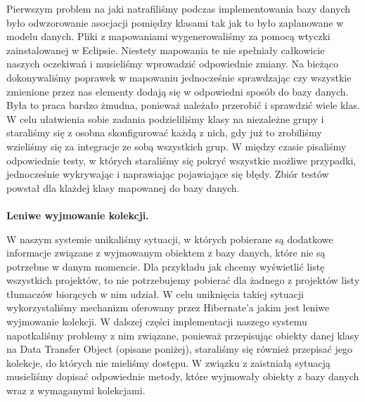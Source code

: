 \documentclass[licencjacka]{pracamgr}
\begin{document}
Pierwszym problem na jaki natrafiliśmy podczas implementowania bazy danych było odwzorowanie asocjacji pomiędzy klasami tak jak to było zaplanowane 
w modelu danych. Pliki z mapowaniami wygenerowaliśmy za pomocą wtyczki zainstalowanej w Eclipsie. Niestety mapowania te nie spełniały całkowicie 
naszych oczekiwań i musieliśmy wprowadzić odpowiednie zmiany. Na bieżąco dokonywaliśmy poprawek w mapowaniu jednocześnie sprawdzając czy wszystkie 
zmienione przez nas elementy dodają się w odpowiedni sposób do bazy danych. Była to praca bardzo żmudna, ponieważ należało przerobić i sprawdzić wiele 
klas. W celu ułatwienia sobie zadania podzieliliśmy klasy na niezależne grupy i staraliśmy się z osobna skonfigurować każdą z nich, gdy już to zrobiliśmy 
wzieliśmy się za integracje ze sobą wszystkich grup. W między czasie pisaliśmy odpowiednie testy, w których staraliśmy się pokryć wszystkie możliwe 
przypadki, jednocześnie wykrywając i naprawiając pojawiające się błędy. Zbiór testów powstał dla klażdej klasy mapowanej do bazy danych.\\\\
\textbf{Leniwe wyjmowanie kolekcji.}

W naszym systemie unikaliśmy sytuacji, w których pobierane są dodatkowe informacje związane z wyjmowanym obiektem z bazy danych, które nie są potrzebne 
w danym momencie. Dla przykładu jak chcemy wyświetlić listę wszystkich projektów, to nie potrzebujemy pobierać dla żadnego 
z projektów listy tłumaczów biorących w nim udział. W celu uniknięcia takiej sytuacji wykorzystaliśmy mechanizm oferowany przez Hibernate'a jakim 
jest leniwe wyjmowanie kolekcji. W dalszej części implementacji naszego systemu napotkaliśmy problemy z nim związane, 
ponieważ przepisując obiekty danej klasy na Data Transfer Object (opisane poniżej), staraliśmy się również przepisać jego kolekcje, do których nie 
mieliśmy dostępu. W związku z zaistniałą sytuacją musieliśmy dopisać odpowiednie metody, które wyjmowały obiekty z bazy danych wraz z wymaganymi 
kolekcjami.
\end{document}
